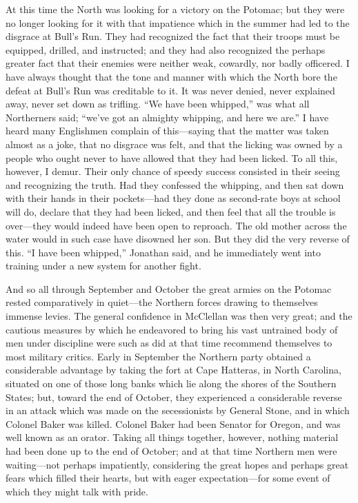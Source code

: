 At this time the North was looking for a victory on the Potomac;
but they were no longer looking for it with that impatience which
in the summer had led to the disgrace at Bull's Run.  They had
recognized the fact that their troops must be equipped, drilled,
and instructed; and they had also recognized the perhaps greater
fact that their enemies were neither weak, cowardly, nor badly
officered.  I have always thought that the tone and manner with
which the North bore the defeat at Bull's Run was creditable to it.
It was never denied, never explained away, never set down as
trifling.  ``We have been whipped,'' was what all Northerners said;
``we've got an almighty whipping, and here we are.''  I have heard
many Englishmen complain of this---saying that the matter was taken
almost as a joke, that no disgrace was felt, and that the licking
was owned by a people who ought never to have allowed that they had
been licked.  To all this, however, I demur.  Their only chance of
speedy success consisted in their seeing and recognizing the truth.
Had they confessed the whipping, and then sat down with their hands
in their pockets---had they done as second-rate boys at school will
do, declare that they had been licked, and then feel that all the
trouble is over---they would indeed have been open to reproach.  The
old mother across the water would in such case have disowned her
son.  But they did the very reverse of this.  ``I have been
whipped,'' Jonathan said, and he immediately went into training
under a new system for another fight.

And so all through September and October the great armies on the
Potomac rested comparatively in quiet---the Northern forces drawing
to themselves immense levies.  The general confidence in McClellan
was then very great; and the cautious measures by which he
endeavored to bring his vast untrained body of men under discipline
were such as did at that time recommend themselves to most military
critics.  Early in September the Northern party obtained a
considerable advantage by taking the fort at Cape Hatteras, in
North Carolina, situated on one of those long banks which lie along
the shores of the Southern States; but, toward the end of October,
they experienced a considerable reverse in an attack which was made
on the secessionists by General Stone, and in which Colonel Baker
was killed.  Colonel Baker had been Senator for Oregon, and was
well known as an orator.  Taking all things together, however,
nothing material had been done up to the end of October; and at
that time Northern men were waiting---not perhaps impatiently,
considering the great hopes and perhaps great fears which filled
their hearts, but with eager expectation---for some event of which
they might talk with pride.

